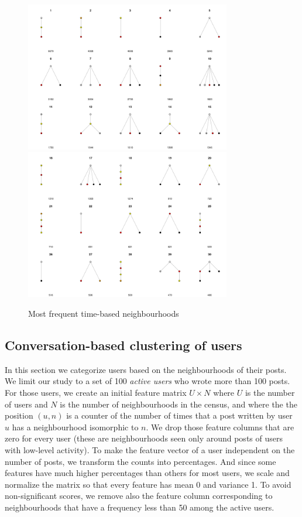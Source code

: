 \documentclass[conference]{IEEEtran}
\begin{document}
\begin{figure}
	\centering
	\includegraphics[width=0.8\textwidth]{census_timebased_1}
	\includegraphics[width=0.8\textwidth]{census_timebased_2}
	\caption{Most frequent time-based neighbourhoods}
	\label{fig:neighbourhoods_time}
\end{figure}

\subsection{Conversation-based clustering of users}
In this section we categorize users based on the neighbourhoods of their posts. We limit our study to a set of 100 \textit{active users} who wrote more than 100 posts. For those users, we create an initial feature matrix $U\times N$ where $U$ is the number of users and $N$ is the number of neighbourhoods in the census, and where the the position $(u,n)$ is a counter of the number of times that a post written by user $u$ has a neighbourhood isomorphic to $n$. We drop those feature columns that are zero for every user (these are neighbourhoods seen only around posts of users with low-level activity). To make the feature vector of a user independent on the number of posts, we transform the counts into percentages. And since some features have much higher percentages than others for most users, we scale and normalize the matrix so that every feature has mean 0 and variance 1. To avoid non-significant scores, we remove also the feature column corresponding to neighbourhoods that have a frequency less than 50 among the active users.
\end{document}

